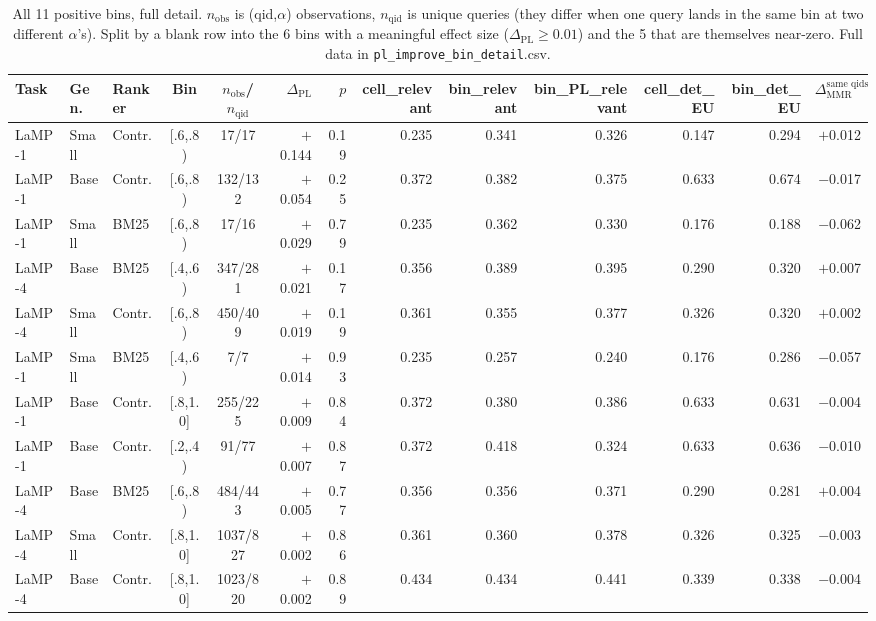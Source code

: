 \documentclass[10pt]{article}
\begin{document}
\begin{table}[h]
\centering
\tiny
\begin{tabular}{@{}lllccrrrrrrrr@{}}
\toprule
Task & Gen. & Ranker & Bin & $n_{\text{obs}}$/$n_{\text{qid}}$ & $\Delta_{\text{PL}}$ & $p$ & cell\_relevant & bin\_relevant & bin\_PL\_relevant & cell\_det\_EU & bin\_det\_EU & $\Delta_{\text{MMR}}^{\text{same qids}}$ \\
\midrule
LaMP-1 & Small & Contr. & [.6,.8) & 17/17 & $+$0.144 & 0.19 & 0.235 & 0.341 & 0.326 & 0.147 & 0.294 & $+$0.012 \\
LaMP-1 & Base & Contr. & [.6,.8) & 132/132 & $+$0.054 & 0.25 & 0.372 & 0.382 & 0.375 & 0.633 & 0.674 & $-$0.017 \\
LaMP-1 & Small & BM25 & [.6,.8) & 17/16 & $+$0.029 & 0.79 & 0.235 & 0.362 & 0.330 & 0.176 & 0.188 & $-$0.062 \\
LaMP-4 & Base & BM25 & [.4,.6) & 347/281 & $+$0.021 & 0.17 & 0.356 & 0.389 & 0.395 & 0.290 & 0.320 & $+$0.007 \\
LaMP-4 & Small & Contr. & [.6,.8) & 450/409 & $+$0.019 & 0.19 & 0.361 & 0.355 & 0.377 & 0.326 & 0.320 & $+$0.002 \\
LaMP-1 & Small & BM25 & [.4,.6) & 7/7 & $+$0.014 & 0.93 & 0.235 & 0.257 & 0.240 & 0.176 & 0.286 & $-$0.057 \\
\addlinespace
LaMP-1 & Base & Contr. & [.8,1.0] & 255/225 & $+$0.009 & 0.84 & 0.372 & 0.380 & 0.386 & 0.633 & 0.631 & $-$0.004 \\
LaMP-1 & Base & Contr. & [.2,.4) & 91/77 & $+$0.007 & 0.87 & 0.372 & 0.418 & 0.324 & 0.633 & 0.636 & $-$0.010 \\
LaMP-4 & Base & BM25 & [.6,.8) & 484/443 & $+$0.005 & 0.77 & 0.356 & 0.356 & 0.371 & 0.290 & 0.281 & $+$0.004 \\
LaMP-4 & Small & Contr. & [.8,1.0] & 1037/827 & $+$0.002 & 0.86 & 0.361 & 0.360 & 0.378 & 0.326 & 0.325 & $-$0.003 \\
LaMP-4 & Base & Contr. & [.8,1.0] & 1023/820 & $+$0.002 & 0.89 & 0.434 & 0.434 & 0.441 & 0.339 & 0.338 & $-$0.004 \\
\bottomrule
\end{tabular}
\caption{All 11 positive bins, full detail. $n_{\text{obs}}$ is (qid,$\alpha$)
observations, $n_{\text{qid}}$ is unique queries (they differ when one query lands
in the same bin at two different $\alpha$'s). Split by a blank row into the 6 bins
with a meaningful effect size ($\Delta_{\text{PL}}\geq0.01$) and the 5 that are
themselves near-zero. Full data in \texttt{pl\_improve\_bin\_detail}.csv.}
\label{tab:detail}
\end{table}
\end{document}
